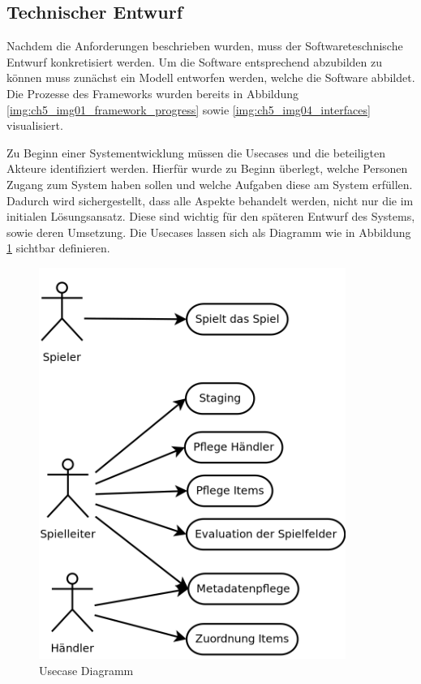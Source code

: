 

\subsection*{Technischer Entwurf}

Nachdem die Anforderungen beschrieben wurden, muss der Softwareteschnische Entwurf konkretisiert werden.
Um die Software entsprechend abzubilden zu können muss zunächst ein Modell entworfen werden, welche die Software abbildet. Die Prozesse des Frameworks wurden bereits in Abbildung \ref{img:ch5_img01_framework_progress} sowie \ref{img:ch5_img04_interfaces} visualisiert.

Zu Beginn einer Systementwicklung müssen die Usecases und die beteiligten Akteure identifiziert werden.
Hierfür wurde zu Beginn überlegt, welche Personen Zugang zum System haben sollen und welche Aufgaben diese am System erfüllen.
Dadurch wird sichergestellt, dass alle Aspekte behandelt werden, nicht nur die im initialen Lösungsansatz. Diese sind wichtig für den späteren Entwurf des Systems, sowie deren Umsetzung.
Die Usecases lassen sich als Diagramm wie in Abbildung \ref{img:ch5_img06_usecases} sichtbar definieren.



\begin{figure}[H]
\begin{center}
\includegraphics[width=100mm]{images/ch5_img06_usecases.png}
\caption{Usecase Diagramm}
\label{img:ch5_img06_usecases}
\end{center}
\end{figure}

